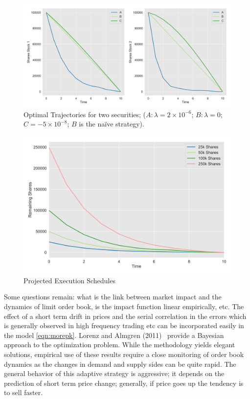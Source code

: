 	\begin{figure}[!ht]
	\centering
	\includegraphics[width=\textwidth]{chapters/chapter_exec_models/figures/opt_traj1.png}
	\caption{Optimal Trajectories for two securities; ($A: \lambda= 2 \times 10^{-6}$; $B: \lambda=0$; $C= -5 \times 10^{-8}$; $B$ is the na\"ive strategy). \label{fig:7first}}
	\end{figure}
	\begin{figure}[!ht] 
	\centering
	\includegraphics[width=\textwidth]{chapters/chapter_exec_models/figures/opt_traj2.png}
	\caption{Projected Execution Schedules \label{fig:7second}}
	\end{figure}
 

Some questions remain: what is the link between market impact and the dynamics of limit order book, is the impact function linear empirically, etc. The effect of a short term drift in prices and the serial correlation in the errors which is generally observed in high frequency trading etc can be incorporated easily in the model \eqref{eqn:morepk}. Lorenz and Almgren (2011)~\cite{lovenz2011} provide a Bayesian approach to the optimization problem. While the methodology yields elegant solutions, empirical use of these results require a close monitoring of order book dynamics as the changes in demand and supply sides can be quite rapid. The general behavior of this adaptive strategy is aggressive; it depends on the prediction of short term price change; generally, if price goes up the tendency is to sell faster. 


